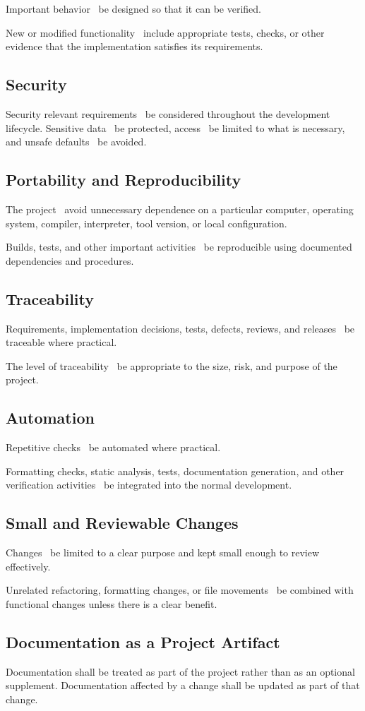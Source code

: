 Important behavior \should~be designed so that it can be verified.

New or modified functionality \should~include appropriate tests, checks, or other evidence that the implementation satisfies its requirements.

\subsection{Security}

Security relevant requirements \should~be considered throughout the development lifecycle.
Sensitive data \should~be protected, access \should~be limited to what is necessary, and unsafe defaults \should~be avoided.

\subsection{Portability and Reproducibility}

The project \should~avoid unnecessary dependence on a particular computer, operating system, compiler, interpreter, tool version, or local configuration.

Builds, tests, and other important activities \should~be reproducible using documented dependencies and procedures.

\subsection{Traceability}

Requirements, implementation decisions, tests, defects, reviews, and releases \should~be traceable where practical.

The level of traceability \should~be appropriate to the size, risk, and purpose of the project.

\subsection{Automation}

Repetitive checks \should~be automated where practical.

Formatting checks, static analysis, tests, documentation generation, and other verification activities \should~be integrated into the normal development.

\subsection{Small and Reviewable Changes}

Changes \should~be limited to a clear purpose and kept small enough to review effectively.

Unrelated refactoring, formatting changes, or file movements \shouldnot~be combined with functional changes unless there is a clear benefit.

\subsection{Documentation as a Project Artifact}

Documentation shall be treated as part of the project rather than as an optional supplement. Documentation affected by a change shall be updated as part of that change.